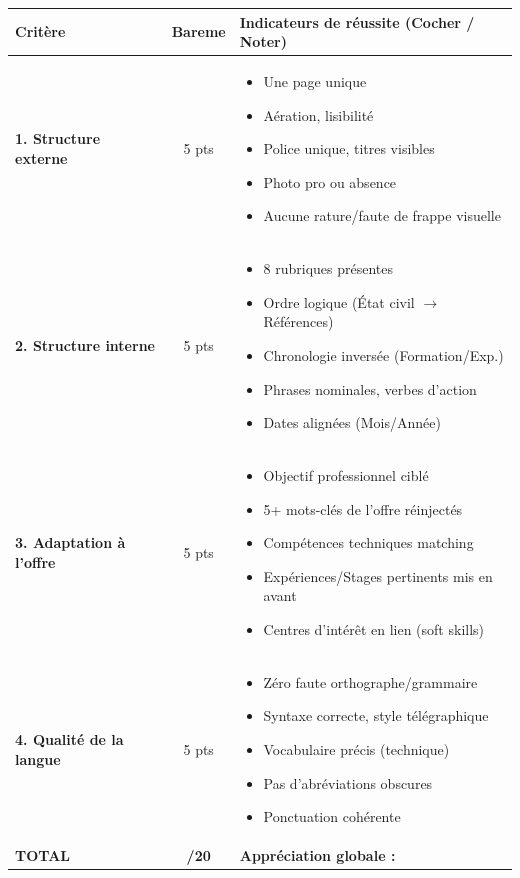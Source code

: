 \documentclass[11pt]{article}
\begin{document}
\begin{center}
\begin{tabularx}{\linewidth}{|l|c|X|}\hline
\rowcolor{popblueL} \textbf{Critère} & \textbf{Bareme} & \textbf{Indicateurs de réussite (Cocher / Noter)} \\ \hline
\textbf{1. Structure externe} & 5 pts & \begin{itemize}\item[$\square$] Une page unique \item[$\square$] Aération, lisibilité \item[$\square$] Police unique, titres visibles \item[$\square$] Photo pro ou absence \item[$\square$] Aucune rature/faute de frappe visuelle\end{itemize} \\ \hline
\textbf{2. Structure interne} & 5 pts & \begin{itemize}\item[$\square$] 8 rubriques présentes \item[$\square$] Ordre logique (État civil $\rightarrow$ Références) \item[$\square$] Chronologie inversée (Formation/Exp.) \item[$\square$] Phrases nominales, verbes d'action \item[$\square$] Dates alignées (Mois/Année)\end{itemize} \\ \hline
\textbf{3. Adaptation à l'offre} & 5 pts & \begin{itemize}\item[$\square$] Objectif professionnel ciblé \item[$\square$] 5+ mots-clés de l'offre réinjectés \item[$\square$] Compétences techniques matching \item[$\square$] Expériences/Stages pertinents mis en avant \item[$\square$] Centres d'intérêt en lien (soft skills)\end{itemize} \\ \hline
\textbf{4. Qualité de la langue} & 5 pts & \begin{itemize}\item[$\square$] Zéro faute orthographe/grammaire \item[$\square$] Syntaxe correcte, style télégraphique \item[$\square$] Vocabulaire précis (technique) \item[$\square$] Pas d'abréviations obscures \item[$\square$] Ponctuation cohérente\end{itemize} \\ \hline
\textbf{TOTAL} & \textbf{/20} & \textbf{Appréciation globale :} \hrulefill \\ \hline
\end{tabularx}
\end{center}
\end{document}
